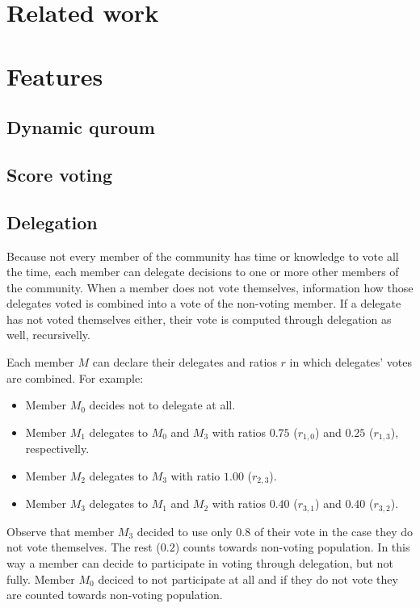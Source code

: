 \documentclass{sigchi}
\begin{document}

\section{Related work}

\cite{andersen2008trust, dirnstorfer2010voting, ford2002delegative, rodriguez2007smartocracy, yamakawa2007toward}

\section{Features}

\subsection{Dynamic quroum}

\subsection{Score voting}

\subsection{Delegation}

Because not every member of the community has time or knowledge to vote all the time, each member can delegate
decisions to one or more other members of the community.
When a member does not vote themselves, information how those delegates voted is combined into a vote of
the non-voting member.
If a delegate has not voted themselves either, their vote is computed through delegation as well, recursivelly.

Each member $M$ can declare their delegates and ratios $r$ in which delegates' votes are combined. For example:

\begin{itemize}
\item Member $M_0$ decides not to delegate at all.
\item Member $M_1$ delegates to $M_0$ and $M_3$ with ratios $0.75$ ($r_{1,0}$) and $0.25$ ($r_{1,3}$), respectivelly.
\item Member $M_2$ delegates to $M_3$ with ratio $1.00$ ($r_{2,3}$).
\item Member $M_3$ delegates to $M_1$ and $M_2$ with ratios $0.40$ ($r_{3,1}$) and $0.40$ ($r_{3,2}$).
\end{itemize}

Observe that member $M_3$ decided to use only $0.8$ of their vote in the case they do not vote themselves.
The rest ($0.2$) counts towards non-voting population.
In this way a member can decide to participate in voting through delegation, but not fully.
Member $M_0$ deciced to not participate at all and if they do not vote they are counted towards non-voting population.
\end{document}
